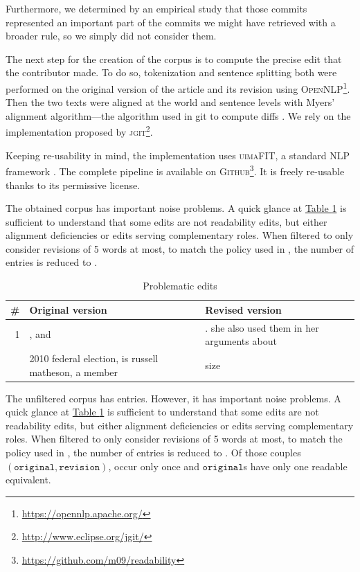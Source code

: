 \documentclass[a4paper, 11pt, onepage]{scrreprt}
\newcommand\tableref[1]{\hyperref[#1]{Table \ref*{#1}}}
\begin{document}
Furthermore, we determined by an empirical study that those commits
represented an important part of the commits we might have retrieved
with a broader rule, so we simply did not consider them.

The next step for the creation of the corpus is to compute the precise
edit that the contributor made. To do so, tokenization and sentence
splitting both were performed on the original version of the article
and its revision using
\textsc{OpenNLP}\footnote{\url{https://opennlp.apache.org/}}. Then the
two texts were aligned at the world and sentence levels with Myers'
alignment algorithm—the algorithm used in git to compute diffs
\cite{myers1988optimal}. We rely on the implementation proposed by
\textsc{jgit}\footnote{\url{http://www.eclipse.org/jgit/}}.

Keeping re-usability in mind, the implementation uses
\textsc{uimaFIT}, a standard NLP framework
\cite{ogren-bethard:2009:SETQA-NLP}. The complete pipeline is
available on
\textsc{Github}\footnote{\url{https://github.com/m09/readability}}. It
is freely re-usable thanks to its permissive license.

The obtained corpus has important noise problems. A quick glance at
\tableref{tab:problematic-edits} is sufficient to understand that some
edits are not readability edits, but either alignment deficiencies or
edits serving complementary roles. When filtered to only consider
revisions of 5 words at most, to match the policy used in
\cite{yatskar2010sake}, the number of entries is reduced to
.

\begin{table}[H]
  \centering
  \caption{Problematic edits}
  \begin{tabular}{rp{6cm}p{6cm}}
    \toprule
    \# & Original version & Revised version \\
    \midrule
    1 & , and & . she also used them in her arguments about \\
    \addlinespace
    2 & 2010 federal election, is russell matheson, a member & size\\
  \end{tabular}
  \label{tab:problematic-edits}
\end{table}

The unfiltered corpus has  entries. However, it has
important noise problems. A quick glance at
\tableref{tab:problematic-edits} is sufficient to understand that some
edits are not readability edits, but either alignment deficiencies or
edits serving complementary roles. When filtered to only consider
revisions of 5 words at most, to match the policy used in
\cite{yatskar2010sake}, the number of entries is reduced to
. Of those  couples $(\mathtt{original},
\mathtt{revision})$,  occur only once and
 $\mathtt{original}$s have only one readable
equivalent.
\end{document}

